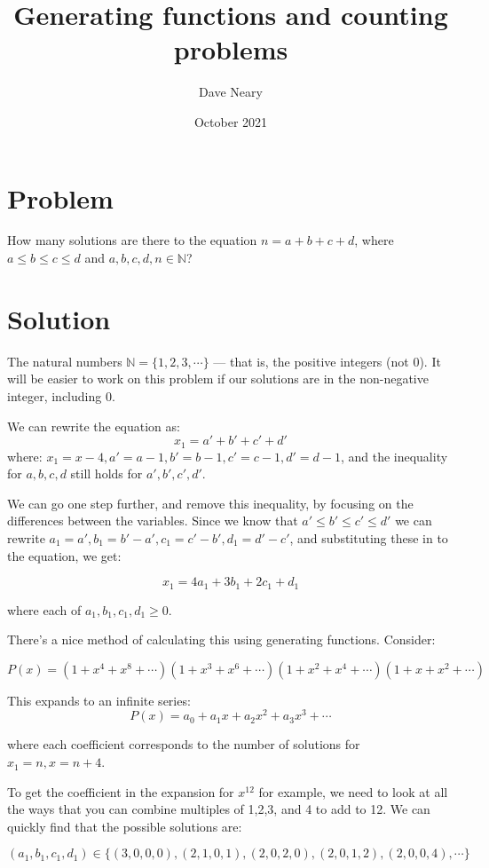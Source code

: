 \documentclass{article}
\title{Generating functions and counting problems}
\author{Dave Neary}
\date{October 2021}
\begin{document}
\maketitle

\section{Problem}

How many solutions are there to the equation $n = a + b + c + d$, where $a \leq b \leq c \leq d$ and $a, b, c, d, n \in \mathbb{N}$?

\section{Solution}

The natural numbers $\mathbb{N} = \{1,2,3,\cdots\}$ — that is, the positive integers (not 0). It will be easier to work on this problem if our solutions are in the non-negative integer, including 0.

We can rewrite the equation as:
\[ x_1= a'+b'+c'+d' \]
where: $x_1=x-4, a'=a-1, b'=b-1, c' = c-1, d' = d-1$, and the inequality for $a,b,c,d$ still holds for $a',b',c',d'$.

We can go one step further, and remove this inequality, by focusing on the
differences between the variables. Since we know that $a'\leq b'\leq c'\leq d'$ we can rewrite 
$a_1 = a', b_1 = b' - a', c_1 = c' - b', d_1 = d' - c'$, and substituting these in to the equation, 
we get:

\[ x_1= 4a_1 + 3b_1 + 2c_1 + d_1 \]

where each of $a_1,b_1,c_1,d_1 \geq 0$.

There's a nice method of calculating this using generating functions. Consider:

\[P(x) = (1+x^4+x^8+\cdots)(1+x^3+x^6+\cdots)(1+x^2+x^4+\cdots)(1+x+x^2+\cdots)\]

This expands to an infinite series:
\[P(x) = a_0 + a_1x + a_2x^2 + a_3x^3 + \cdots\]

where each coefficient corresponds to the number of solutions for $x_1 = n, x = n+4$.

To get the coefficient in the expansion for $x^{12}$ for example, we need to look at all
the ways that you can combine multiples of 1,2,3, and 4 to add to 12. We can quickly find
that the possible solutions are:

\[(a_1,b_1,c_1,d_1) \in \{(3,0,0,0),(2,1,0,1),(2,0,2,0),(2,0,1,2),(2,0,0,4), \cdots\} \]
\end{document}
